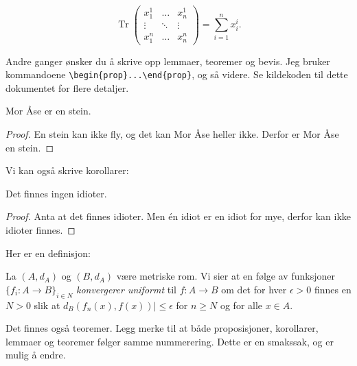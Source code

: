 \documentclass[a4paper, norsk]{article}  %
\DeclareMathOperator{\tr}{Tr}
\begin{document}
\[
\tr \begin{pmatrix}
x_1^1 & \hdots & x_n^1 \\
\vdots & \ddots &  \vdots \\
x_1^n & \hdots & x_n^n
\end{pmatrix} = \sum_{i=1}^n x_i^i.
\]

Andre ganger ønsker du å skrive opp lemmaer, teoremer og bevis. Jeg bruker kommandoene \verb|\begin{prop}...\end{prop}|, og så videre. Se kildekoden til dette dokumentet for flere detaljer.

\begin{prop}
\label{propmorase}
Mor Åse er en stein.
\end{prop}
\begin{proof}
En stein kan ikke fly, og det kan Mor Åse heller ikke. Derfor er Mor Åse en stein.
\end{proof}

Vi kan også skrive korollarer:

\begin{corr}
Det finnes ingen idioter.
\end{corr}
\begin{proof}
Anta at det finnes idioter. Men én idiot er en idiot for mye, derfor kan ikke idioter finnes.
\end{proof}

Her er en definisjon:

\begin{defi}
La $(A,d_A)$ og $(B,d_A)$ være metriske rom. Vi sier at en følge av funksjoner $\{f_i:A \to B \}_{i \in N}$ \emph{konvergerer uniformt} til $f:A \to B$ om det for hver $\epsilon > 0$ finnes en $N > 0$ slik at $d_B(f_n(x),f(x)) \rvert \leq \epsilon$ for $n \geq N$ og for alle $x \in A$. 
\end{defi}

Det finnes også teoremer. Legg merke til at både proposisjoner, korollarer, lemmaer og teoremer følger samme nummerering. Dette er en smakssak, og er mulig å endre.
\end{document}
